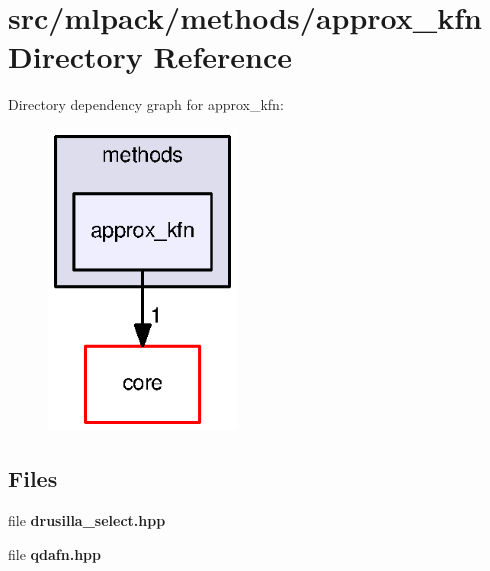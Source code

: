 \section{src/mlpack/methods/approx\+\_\+kfn Directory Reference}
\label{dir_d653de0e5247f0f2599149f8b16e0b6e}
Directory dependency graph for approx\+\_\+kfn\+:
\nopagebreak
\begin{figure}[H]
\begin{center}
\leavevmode
\includegraphics[width=142pt]{dir_d653de0e5247f0f2599149f8b16e0b6e_dep}
\end{center}
\end{figure}
\subsection*{Files}
\begin{DoxyCompactItemize}
\item 
file {\bf drusilla\+\_\+select.\+hpp}
\item 
file {\bf qdafn.\+hpp}
\end{DoxyCompactItemize}
